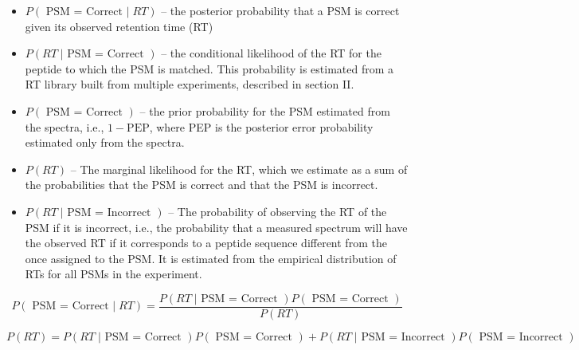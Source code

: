 \begin{itemize}
\item $P(\mbox{ PSM = Correct }|\;RT)$ -- the posterior probability that a PSM is correct given its observed retention time (RT)
\item $P(RT\; | \mbox{ PSM = Correct })$ -- the conditional likelihood of the RT for the peptide to which the PSM is matched. This probability is estimated from a RT library built from multiple experiments, described in section II. 
\item $P(\mbox{ PSM = Correct })$ -- the prior probability for the PSM estimated from the spectra, i.e., $1- \mbox{PEP}$, where PEP is the posterior error probability estimated only from the spectra. 
\item $P(RT)$ -- The marginal likelihood for the RT, which we estimate as a sum of the probabilities that the PSM is correct and that the PSM is incorrect.
\item $P(RT\; | \mbox{ PSM = Incorrect })$ -- The probability of observing the RT of the PSM if it is incorrect, i.e., the probability that a measured spectrum will have the observed RT if it corresponds to a peptide  sequence different from the once assigned to the PSM. It is estimated from the empirical distribution of RTs for all PSMs in the experiment.      
\end{itemize}    

$$ P(\mbox{ PSM = Correct }|\;RT) =
	 \frac{ P(RT\; | \mbox{ PSM = Correct })P(\mbox{ PSM = Correct }) }
	 	  { P(RT) }
$$

$$
P(RT) = P(RT\; | \mbox{ PSM = Correct })P(\mbox{ PSM = Correct }) + 
	 	  	P(RT\; | \mbox{ PSM = Incorrect })P(\mbox{ PSM = Incorrect })
$$



